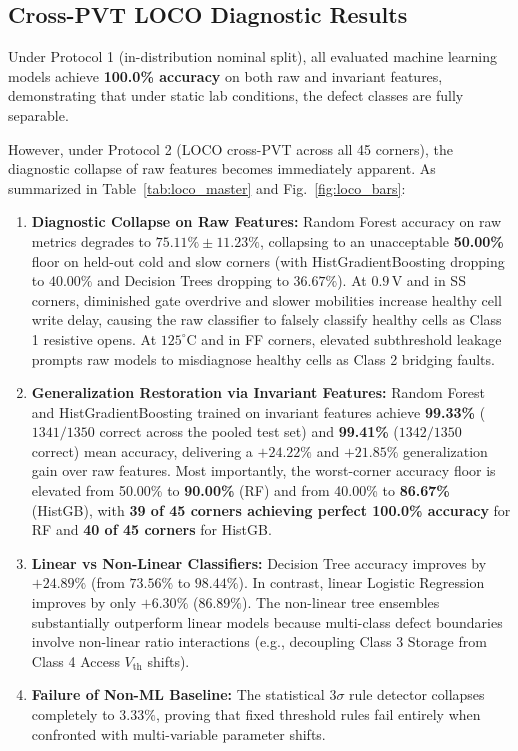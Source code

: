 \documentclass[conference]{IEEEtran}
\begin{document}
\subsection{Cross-PVT LOCO Diagnostic Results}
Under Protocol 1 (in-distribution nominal split), all evaluated machine learning models achieve \textbf{100.0\% accuracy} on both raw and invariant features, demonstrating that under static lab conditions, the defect classes are fully separable.

However, under Protocol 2 (LOCO cross-PVT across all 45 corners), the diagnostic collapse of raw features becomes immediately apparent. As summarized in Table~\ref{tab:loco_master} and Fig.~\ref{fig:loco_bars}:
\begin{enumerate}
    \item \textbf{Diagnostic Collapse on Raw Features:} Random Forest accuracy on raw metrics degrades to $75.11\% \pm 11.23\%$, collapsing to an unacceptable \textbf{50.00\%} floor on held-out cold and slow corners (with HistGradientBoosting dropping to $40.00\%$ and Decision Trees dropping to $36.67\%$). At $0.9\,\text{V}$ and in SS corners, diminished gate overdrive and slower mobilities increase healthy cell write delay, causing the raw classifier to falsely classify healthy cells as Class 1 resistive opens. At $125^\circ\text{C}$ and in FF corners, elevated subthreshold leakage prompts raw models to misdiagnose healthy cells as Class 2 bridging faults.
    \item \textbf{Generalization Restoration via Invariant Features:} Random Forest and HistGradientBoosting trained on invariant features achieve \textbf{99.33\%} ($1341/1350$ correct across the pooled test set) and \textbf{99.41\%} ($1342/1350$ correct) mean accuracy, delivering a \textbf{$+24.22\%$} and \textbf{$+21.85\%$} generalization gain over raw features. Most importantly, the worst-corner accuracy floor is elevated from 50.00\% to \textbf{90.00\%} (RF) and from 40.00\% to \textbf{86.67\%} (HistGB), with \textbf{39 of 45 corners achieving perfect 100.0\% accuracy} for RF and \textbf{40 of 45 corners} for HistGB.
    \item \textbf{Linear vs Non-Linear Classifiers:} Decision Tree accuracy improves by $+24.89\%$ (from $73.56\%$ to $98.44\%$). In contrast, linear Logistic Regression improves by only $+6.30\%$ ($86.89\%$). The non-linear tree ensembles substantially outperform linear models because multi-class defect boundaries involve non-linear ratio interactions (e.g., decoupling Class 3 Storage from Class 4 Access $V_{\text{th}}$ shifts).
    \item \textbf{Failure of Non-ML Baseline:} The statistical $3\sigma$ rule detector collapses completely to $3.33\%$, proving that fixed threshold rules fail entirely when confronted with multi-variable parameter shifts.
\end{enumerate}
\end{document}
